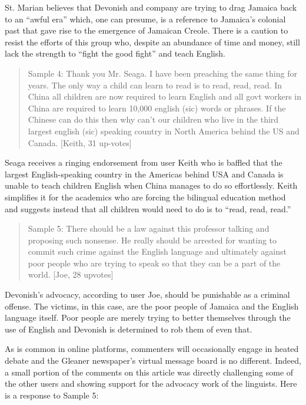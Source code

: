 \documentclass[output=paper,colorlinks,citecolor=brown]{langscibook}
\begin{document}
St. Marian believes that Devonish and company are trying to drag Jamaica back to an “awful era” which, one can presume, is a reference to Jamaica’s colonial past that gave rise to the emergence of Jamaican Creole. There is a caution to resist the efforts of this group who, despite an abundance of time and money, still lack the strength to “fight the good fight” and teach English. 

\begin{quote}
    Sample 4: Thank you Mr. Seaga. I have been preaching the same thing for years. The only way a child can learn to read is to read, read, read. In China all children are now required to learn English and all govt workers in China are required to learn 10,000 english (sic) words or phrases. If the Chinese can do this then why can’t our children who live in the third largest english (sic) speaking country in North America behind the US and Canada.  [Keith, 31 up-votes]
\end{quote}

Seaga receives a ringing endorsement from user Keith who is baffled that the largest English-speaking country in the Americas behind USA and Canada is unable to teach children English when China manages to do so effortlessly. Keith simplifies it for the academics who are forcing the bilingual education method and suggests instead that all children would need to do is to “read, read, read.”

\begin{quote}
    Sample 5: There should be a law against this professor talking and proposing such nonsense. He really should be arrested for wanting to commit such crime against the English language and ultimately against poor people who are trying to speak so that they can be a part of the world. [Joe, 28 upvotes]
\end{quote}

Devonish’s advocacy, according to user Joe, should be punishable as a criminal offense. The victims, in this case, are the poor people of Jamaica and the English language itself. Poor people are merely trying to better themselves through the use of English and Devonish is determined to rob them of even that. 

As is common in online platforms, commenters will occasionally engage in heated debate and the Gleaner newspaper’s virtual message board is no different. Indeed, a small portion of the comments on this article was directly challenging some of the other users and showing support for the advocacy work of the linguists. Here is a response to Sample 5: 
\end{document}

